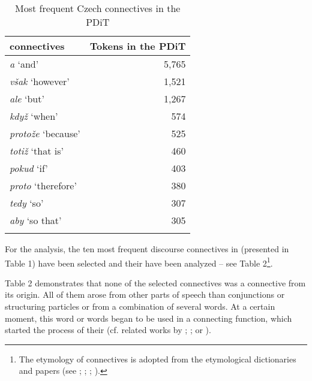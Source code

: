 \documentclass[output=paper]{langsci/langscibook.cls}
\begin{document}
\begin{table} 
\begin{tabular}{lr}
\lsptoprule
	 {\isi{Czech} connectives } &  {Tokens in the PDiT}\\
\midrule
	\textit{a} `and' & 5,765\\
	\textit{však} `however' & 1,521\\
	\textit{ale} `but' & 1,267\\
	\textit{když } `when' & 574\\
	\textit{protože} `because' & 525\\
	\textit{totiž} `that is' & 460\\
	\textit{pokud} `if'  & 403\\
	\textit{proto} `therefore' & 380\\
	\textit{tedy} `so' & 307\\
	\textit{aby} `so that' & 305\\
\lspbottomrule
\end{tabular}
\caption{Most frequent Czech connectives in the PDiT}
\label{tab:mostfrequentczPDT}
\end{table}


For the analysis, the ten most frequent discourse connectives in  (presented in Table 1) have been selected and their  have been analyzed – see Table 2\footnote{ The etymology of  connectives is adopted from the  etymological dictionaries and papers (see \citet{kopevcny1952etymologicky}; \citet{rejzek2001vcesky}; \citet{bauer1962spojky}; \citet{bauer11podil}).}.

Table 2 demonstrates that none of the selected connectives was a connective from its origin. All of them arose from other parts of speech than conjunctions or structuring particles or from a combination of several words. At a certain moment, this word or words began to be used in a connecting function, which started the process of their  (cf. related works by  \citealt{claridge2010pragmaticalisation}; \citealt{degand2011introduction}; \citealt{claridge2013evolution} or \citealt{degand2015grammaticalization}).
\end{document}
